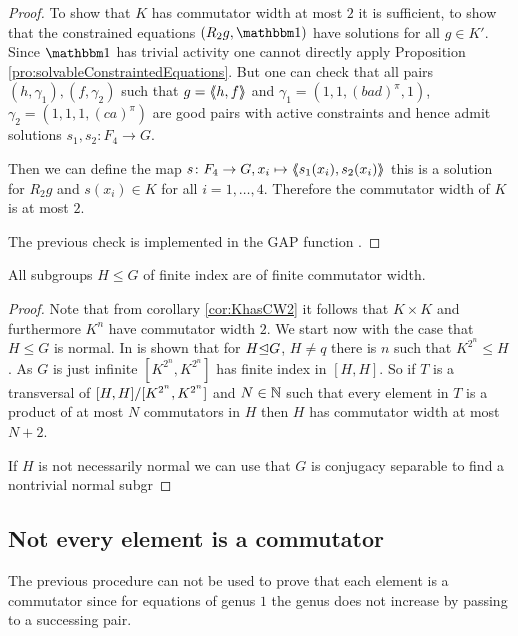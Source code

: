 \documentclass[a4paper,11pt]{amsart}
\begin{document}
\begin{proof}
 To show that $K$ has commutator width at most $2$ it is sufficient, to show that the constrained equations $(R_2g,\id)$ have solutions for all $g\in K'$. 
 Since $\id$ has trivial activity one cannot directly apply Proposition \ref{pro:solvableConstraintedEquations}.
 But one can check that all pairs $(h,\gamma_1),(f,\gamma_2)$
 such that $g=\langle\negthickspace\langle h,f\rangle\negthickspace\rangle$ and $\gamma_1=(1,1,(bad)^\pi,1)$, $\gamma_2=(1,1,1,(ca)^\pi)$
 are good pairs with active constraints and hence admit solutions $s_1,s_2\colon F_4\to G$.
 
 Then we can define the map $s\colon F_4\to G, x_i\mapsto \langle\negthickspace\langle s_1(x_i),s_2(x_i)\rangle\negthickspace\rangle$ this is a solution
 for $R_2g$ and $s(x_i)\in K$ for all $i=1,\ldots,4$. Therefore the commutator width of $K$ is at most $2$.
 
 The previous check is implemented in the GAP function . 
\end{proof}
\begin{cor}
  All subgroups $H \leq G$ of finite index are of finite commutator width.
\end{cor}

\begin{proof}
 Note that from corollary \ref{cor:KhasCW2} it follows that $K\times K$ and furthermore $K^n$ have commutator width $2$.
 We start now with the case that $H\leq G$ is normal. 
 In %
 is shown that for $H{\mathrel\trianglelefteq} G$, $H\neq q$ there is $n$ such that $K^{2^n}\leq H$. As $G$ is just infinite $[K^{2^n},K^{2^n}]$ has finite index in $[H,H]$.
 So if $T$ is a transversal of ${[H,H]/[K^{2^n},K^{2^n}]}$ and $N\in \mathbb{N}$ such that every element in $T$ is a product of at most $N$ commutators
 in $H$ then $H$ has commutator width at most $N+2$.
 
 If $H$ is not necessarily normal we can use that $G$ is conjugacy separable %
 to find a nontrivial normal subgr
\end{proof}
\subsection{Not every element is a commutator}
The previous procedure can not be used to prove that each element is a commutator since for equations of genus $1$ the 
genus does not increase by passing to a successing pair. 
\end{document}
